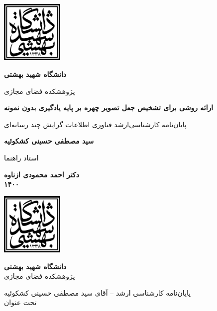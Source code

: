 \thispagestyle{empty}
\begin{center}
\includegraphics[height=3cm]{sbu_logo.png}
\vspace{0.4cm}

\textbf{دانشگاه شهید بهشتی}\\
\vspace{0.4cm}

{\large

	پژوهشکده فضای مجازی
}
\vspace{3.5cm}

{\Large
	\textbf{ارائه روشی برای تشخیص جعل تصویر چهره بر پایه یادگیری بدون نمونه}\\
}
\vspace{3.5cm}

{\Large
	پایان‌نامه کارشناسی‌ارشد فناوری اطلاعات گرایش چند رسانه‌ای\\
}
\vspace{1cm}

{\large
	\textbf{سید مصطفی حسینی کشکوئیه}\\
}
\vspace{2.5cm}

{\large
	استاد راهنما\\
}
\vspace{0.5cm}

{\large
	\textbf{دکتر احمد محمودی ازناوه}\\
}
\vspace{5cm}
\textbf{۱۴۰۰}

\end{center}
\restoregeometry
\pagebreak

\thispagestyle{empty}
\begin{center}
	\includegraphics[height=3cm]{sbu_logo.png}
	
	{\large
		\textbf{دانشگاه شهید بهشتی}\\
	پژوهشکده فضای مجازی
	}
	\vspace{5cm}
	
	
	{\Large	
		پایان‌نامه کارشناسی ارشد --
		آقای سید مصطفی حسینی کشکوئیه \\
		\vspace{.3cm}
		تحت عنوان\\
	}
\end{center}


